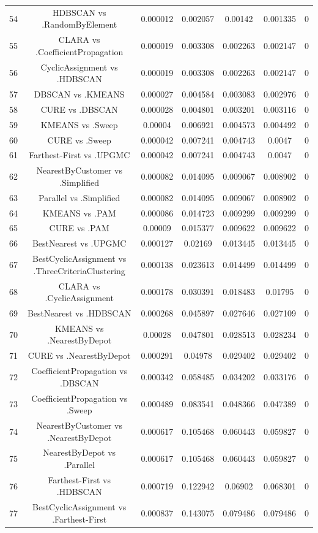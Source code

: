 \documentclass[a4paper,10pt]{article}
\begin{document}
\begin{landscape}
\begin{table}[!htp]
\begin{tabular}{ccccccc}
54&HDBSCAN vs .RandomByElement&0.000012&0.002057&0.00142&0.001335&0\\
55&CLARA vs .CoefficientPropagation&0.000019&0.003308&0.002263&0.002147&0\\
56&CyclicAssignment vs .HDBSCAN&0.000019&0.003308&0.002263&0.002147&0\\
57&DBSCAN vs .KMEANS&0.000027&0.004584&0.003083&0.002976&0\\
58&CURE vs .DBSCAN&0.000028&0.004801&0.003201&0.003116&0\\
59&KMEANS vs .Sweep&0.00004&0.006921&0.004573&0.004492&0\\
60&CURE vs .Sweep&0.000042&0.007241&0.004743&0.0047&0\\
61&Farthest-First vs .UPGMC&0.000042&0.007241&0.004743&0.0047&0\\
62&NearestByCustomer vs .Simplified&0.000082&0.014095&0.009067&0.008902&0\\
63&Parallel vs .Simplified&0.000082&0.014095&0.009067&0.008902&0\\
64&KMEANS vs .PAM&0.000086&0.014723&0.009299&0.009299&0\\
65&CURE vs .PAM&0.00009&0.015377&0.009622&0.009622&0\\
66&BestNearest vs .UPGMC&0.000127&0.02169&0.013445&0.013445&0\\
67&BestCyclicAssignment vs .ThreeCriteriaClustering&0.000138&0.023613&0.014499&0.014499&0\\
68&CLARA vs .CyclicAssignment&0.000178&0.030391&0.018483&0.01795&0\\
69&BestNearest vs .HDBSCAN&0.000268&0.045897&0.027646&0.027109&0\\
70&KMEANS vs .NearestByDepot&0.00028&0.047801&0.028513&0.028234&0\\
71&CURE vs .NearestByDepot&0.000291&0.04978&0.029402&0.029402&0\\
72&CoefficientPropagation vs .DBSCAN&0.000342&0.058485&0.034202&0.033176&0\\
73&CoefficientPropagation vs .Sweep&0.000489&0.083541&0.048366&0.047389&0\\
74&NearestByCustomer vs .NearestByDepot&0.000617&0.105468&0.060443&0.059827&0\\
75&NearestByDepot vs .Parallel&0.000617&0.105468&0.060443&0.059827&0\\
76&Farthest-First vs .HDBSCAN&0.000719&0.122942&0.06902&0.068301&0\\
77&BestCyclicAssignment vs .Farthest-First&0.000837&0.143075&0.079486&0.079486&0\\

\end{tabular}
\end{table}
\end{landscape}
\end{document}
